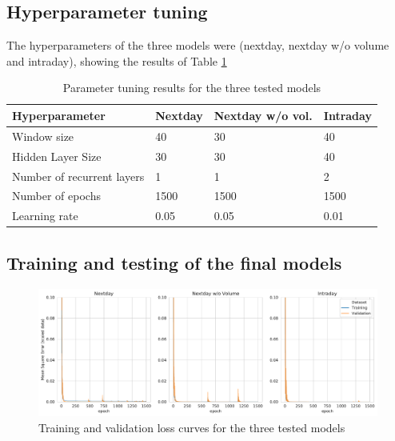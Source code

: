 \documentclass[10pt,twocolumn,letterpaper]{article}
\begin{document}
\subsection{Hyperparameter tuning}

The hyperparameters of the three models were (nextday, nextday w/o volume and intraday), showing the results of Table \ref{table:tuning_res}

\begin{table}[H]
	\begin{center}
		\begin{tabular}{|p{2.9cm}|p{1cm}|p{1cm}|p{1.1cm}|}
			\hline
			Hyperparameter & Nextday & Nextday w/o vol. & Intraday \\
			\hline\hline
			Window size & 40 & 30 & 40 \\
			Hidden Layer Size & 30 & 30 & 40 \\
			Number of recurrent layers & 1 & 1 & 2 \\
			Number of epochs & 1500 & 1500 & 1500 \\
			Learning rate & 0.05 & 0.05 & 0.01 \\
			\hline
		\end{tabular}
	\end{center}
	\caption{Parameter tuning results for the three tested models}
	\label{table:tuning_res}
\end{table}


\subsection{Training and testing of the final models}



\begin{figure}[h]
	\begin{center}
		\includegraphics[width=0.9\linewidth]{train_val_loss.pdf}
		
		\caption{Training and validation loss curves for the three tested models}
		\label{fig:loss}
	\end{center}
\end{figure}
\end{document}
